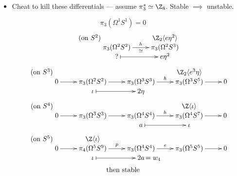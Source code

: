 \documentclass[11pt]{article}
\begin{document}
\begin{talk}
\begin{itemize}\squishlist
\setlength{\parindent}{.25in}
\item Cheat to kill these differentials --- assume $\pi_3^s\simeq\Z_8$. Stable $\implies$ unstable.
\end{itemize}
\[\tag{on $S^1$}\pi_3({\Omega^1 S^1})=0\]
\[\tag{on $S^2$}\xymatrix@!R@R=-1mm{
&\Z_2\langle e\eta^2\rangle\\
\pi_3{(\Omega^2 S^2)}
\ar[r]^-{h}_-\simeq
&%
\pi_3(\Omega^2S^3)
\\%
?\ar@{|->}[r]
&%
e\eta^2%
}\]
\[\tag{on $S^3$}\xymatrix@!R@R=-1mm{
&&&\Z_2\langle e^3\eta\rangle&
\\%
0\ar[r]&\pi_3(\Omega^2S^2)\ar[r]&
\pi_3{(\Omega^3 S^3)}
\ar[r]^-{h}
&%
\pi_3(\Omega^3S^5)\ar[r]
&%
0%
\\%
&%
\iota\ar@{|->}[r]
&%
2\eta&%
}\]
\[\tag{on $S^4$}\xymatrix@!R@R=-1mm{
&&&\Z\langle \iota\rangle&
\\%
0\ar[r]&\pi_3(\Omega^3S^3)\ar[r]&
\pi_3{(\Omega^4 S^4)}
\ar[r]^-{h}
&%
\pi_3(\Omega^4S^7)\ar[r]
&%
0%
\\%
&&%
a\ar@{|->}[r]
&%
\iota&%
}\]
\[\tag{on $S^5$}\xymatrix@!R@R=-1mm{
&\Z\langle \iota\rangle&
\\%
0\ar[r]&\pi_4(\Omega^5S^9)\ar[r]^-{p}&
\pi_3{(\Omega^4 S^4)}
\ar[r]^-{e}
&%
\pi_3(\Omega^5S^5)\ar[r]
&%
0%
\\%
&%
\iota\ar@{|->}[r]
&%
2a\makebox[0cm][l]{\,$=w_4$}&%
}\]
\[\textup{then stable}\]
\end{talk}
\end{document}

